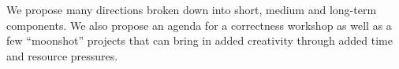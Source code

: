 \begin{WrapText}
\footnotesize
 
 We propose many directions
 broken down into short, medium and
 long-term components.
 We also propose
 an agenda for a correctness
 workshop as well as 
 a few   ``moonshot'' projects
 that can bring in added creativity through added time and resource pressures.
 
\end{WrapText}